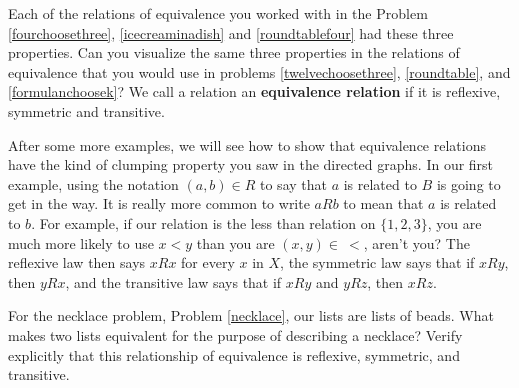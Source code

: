 Each of the relations of equivalence you worked with in the
Problem \ref{fourchoosethree}, \ref{icecreaminadish} and
\ref{roundtablefour}  had these three properties.  Can you
visualize the same three properties in the relations of
equivalence that you would use in problems
\ref{twelvechoosethree}, \ref{roundtable}, and
\ref{formulanchoosek}? We call a relation an {\bf equivalence
relation} if it is reflexive,
symmetric and transitive. 

 
After some more examples, we will see how to show that
equivalence relations have the kind of clumping property you
saw in the directed graphs.  In our first example, using the
notation $(a,b) \in R$ to say that $a$ is related to $B$ is
going to get in the way.  It is really more common to write $a
R b$ to mean that $a$ is related to $b$. For example, if our
relation is the less than relation on $\{1,2,3\}$, you are
much more likely to use $x<y$ than you are $(x,y)\in \ <$,
aren't you? The reflexive law then says
$xRx$ for every
$x$ in
$X$, the symmetric law says that if $xRy$, then $yRx$, and the
transitive law says that if
$xRy$ and $yRz$, then $xRz$.

\bp 
\item For the necklace problem, Problem \ref{necklace}, our
lists are lists of beads.  What makes two lists equivalent for
the purpose of describing a necklace?  Verify explicitly that
this relationship of equivalence is reflexive, symmetric, and
transitive.

